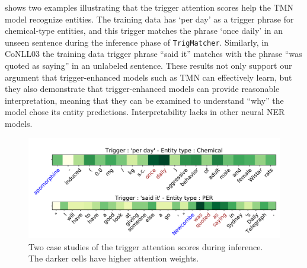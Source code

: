  shows two examples illustrating that the trigger attention scores help the TMN model recognize entities. The training data has `per day' as a trigger phrase for chemical-type entities, and this trigger matches the phrase `once daily' in an unseen sentence during the inference phase of \texttt{TrigMatcher}.
Similarly, in CoNLL03 the training data trigger phrase ``said it'' matches with the phrase ``was quoted as saying'' in an unlabeled sentence.
These results not only support our argument that trigger-enhanced models such as TMN can effectively learn, but they also demonstrate that trigger-enhanced models can provide reasonable interpretation, meaning that they can be examined to understand ``why'' the model chose its entity predictions. Interpretability lacks in other neural NER models.


\begin{figure}[h]
	\centering 
	\includegraphics[width=0.7\linewidth]{LatexDiss/figures/casestudy.pdf}
	\caption{Two case studies of the trigger attention scores during inference. The darker cells have higher attention weights.} 
	\label{fig:casestudy}
\end{figure}






